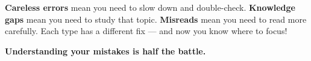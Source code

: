 {\begin{tcolorbox}[
    enhanced,
    colback=funYellowLight,
    colframe=funYellow!60,
    arc=10pt,
    boxrule=1pt,
    left=6mm, right=6mm, top=4mm, bottom=4mm,
]
\vspace{2mm}

\textbf{Careless errors} mean you need to slow down and double-check. \textbf{Knowledge gaps} mean you need to study that topic. \textbf{Misreads} mean you need to read more carefully. Each type has a different fix — and now you know where to focus!
\end{tcolorbox}

\vspace{4mm}

\begin{center}
{\large\bfseries\color{funGreenDark} \faBrain\hspace{2mm}Understanding your mistakes is half the battle.\hspace{2mm}\faBrain}
\end{center}

}
\newpage
